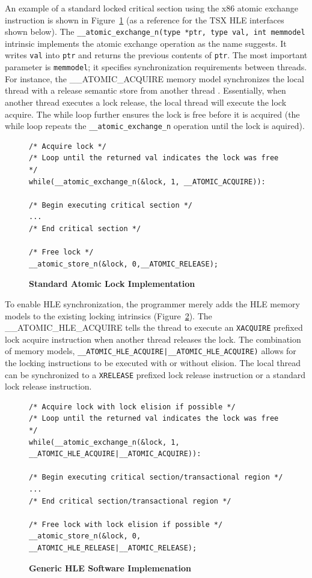 \documentclass[11pt]{book}
\begin{document}
An example of a standard locked critical section using the x86 atomic exchange instruction
is shown in Figure~\ref{fig:lock_interface} (as a reference for the TSX HLE interfaces
shown below).  The \texttt{\_\_atomic\_exchange\_n(type *ptr, type val, int memmodel}
intrinsic implements the atomic exchange operation as the name suggests.  It writes
\texttt{val} into \texttt{ptr} and returns the previous contents of \texttt{ptr}.  The
most important parameter is \texttt{memmodel}; it specifies synchronization requirements
between threads.  For instance, the \_\_ATOMIC\_ACQUIRE memory model synchronizes the
local thread with a release semantic store from another thread \cite{gcc}.  Essentially,
when another thread executes a lock release, the local thread will execute the lock
acquire.  The while loop further ensures the lock is free before it is acquired (the
while loop repeats the \texttt{\_\_atomic\_exchange\_n} operation until the lock is
aquired). 

\begin{figure}
\begin{verbatim}
/* Acquire lock */
/* Loop until the returned val indicates the lock was free */
while(__atomic_exchange_n(&lock, 1, __ATOMIC_ACQUIRE)):

/* Begin executing critical section */
...
/* End critical section */

/* Free lock */
__atomic_store_n(&lock, 0,__ATOMIC_RELEASE);
\end{verbatim}
    \caption{\textbf{Standard Atomic Lock Implementation}}\label{fig:lock_interface} 
\end{figure}

To enable HLE synchronization, the programmer merely adds the HLE memory models to the
existing locking intrinsics (Figure~\ref{fig:hle_interface}).  The
\_\_ATOMIC\_HLE\_ACQUIRE tells the thread to execute an \texttt{XACQUIRE} prefixed lock
acquire instruction when another thread releases the lock.  The combination of memory
models, \texttt{\_\_ATOMIC\_HLE\_ACQUIRE|\_\_ATOMIC\_HLE\_ACQUIRE)} allows for the locking
instructions to be executed with or without elision.  The local thread can be synchronized
to a \texttt{XRELEASE} prefixed lock release instruction or a standard lock release
instruction.

\begin{figure}
\begin{verbatim}
/* Acquire lock with lock elision if possible */
/* Loop until the returned val indicates the lock was free */
while(__atomic_exchange_n(&lock, 1, __ATOMIC_HLE_ACQUIRE|__ATOMIC_ACQUIRE)):

/* Begin executing critical section/transactional region */
...
/* End critical section/transactional region */

/* Free lock with lock elision if possible */
__atomic_store_n(&lock, 0, __ATOMIC_HLE_RELEASE|__ATOMIC_RELEASE);
\end{verbatim}
    \caption{\textbf{Generic HLE Software Implemenation}}\label{fig:hle_interface}
\end{figure}
\end{document}
